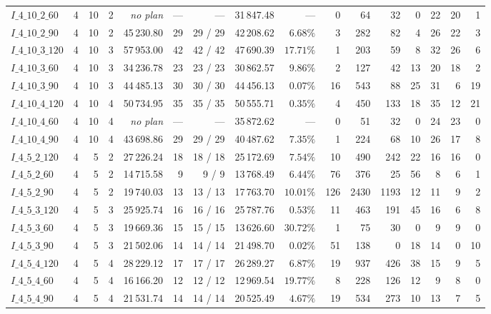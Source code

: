 \begin{table}[!htbp]
{\begin{tabular}{lrrrrrrlrrrrrrrr}
$I\_4\_10\_2\_60$ & 4 & 10 & 2 & \emph{no plan} & --- & --- & 31\,847.48 & --- & 0 & 64 & 32 & 0 & 22 & 20 & 1 \\
$I\_4\_10\_2\_90$ & 4 & 10 & 2 & 45\,230.80 & 29 & 29 / 29 & 42\,208.62 & $6.68\%$ & 3 & 282 & 82 & 4 & 26 & 22 & 3 \\
$I\_4\_10\_3\_120$ & 4 & 10 & 3 & 57\,953.00 & 42 & 42 / 42 & 47\,690.39 & $17.71\%$ & 1 & 203 & 59 & 8 & 32 & 26 & 6 \\
$I\_4\_10\_3\_60$ & 4 & 10 & 3 & 34\,236.78 & 23 & 23 / 23 & 30\,862.57 & $9.86\%$ & 2 & 127 & 42 & 13 & 20 & 18 & 2 \\
$I\_4\_10\_3\_90$ & 4 & 10 & 3 & 44\,485.13 & 30 & 30 / 30 & 44\,456.13 & $0.07\%$ & 16 & 543 & 88 & 25 & 31 & 6 & 19 \\
$I\_4\_10\_4\_120$ & 4 & 10 & 4 & 50\,734.95 & 35 & 35 / 35 & 50\,555.71 & $0.35\%$ & 4 & 450 & 133 & 18 & 35 & 12 & 21 \\
$I\_4\_10\_4\_60$ & 4 & 10 & 4 & \emph{no plan} & --- & --- & 35\,872.62 & --- & 0 & 51 & 32 & 0 & 24 & 23 & 0 \\
$I\_4\_10\_4\_90$ & 4 & 10 & 4 & 43\,698.86 & 29 & 29 / 29 & 40\,487.62 & $7.35\%$ & 1 & 224 & 68 & 10 & 26 & 17 & 8 \\
$I\_4\_5\_2\_120$ & 4 & 5 & 2 & 27\,226.24 & 18 & 18 / 18 & 25\,172.69 & $7.54\%$ & 10 & 490 & 242 & 22 & 16 & 16 & 0 \\
$I\_4\_5\_2\_60$ & 4 & 5 & 2 & 14\,715.58 & 9 & 9 / 9 & 13\,768.49 & $6.44\%$ & 76 & 376 & 25 & 56 & 8 & 6 & 1 \\
$I\_4\_5\_2\_90$ & 4 & 5 & 2 & 19\,740.03 & 13 & 13 / 13 & 17\,763.70 & $10.01\%$ & 126 & 2430 & 1193 & 12 & 11 & 9 & 2 \\
$I\_4\_5\_3\_120$ & 4 & 5 & 3 & 25\,925.74 & 16 & 16 / 16 & 25\,787.76 & $0.53\%$ & 11 & 463 & 191 & 45 & 16 & 6 & 8 \\
$I\_4\_5\_3\_60$ & 4 & 5 & 3 & 19\,669.36 & 15 & 15 / 15 & 13\,626.60 & $30.72\%$ & 1 & 75 & 30 & 0 & 9 & 9 & 0 \\
$I\_4\_5\_3\_90$ & 4 & 5 & 3 & 21\,502.06 & 14 & 14 / 14 & 21\,498.70 & $0.02\%$ & 51 & 138 & 0 & 18 & 14 & 0 & 10 \\
$I\_4\_5\_4\_120$ & 4 & 5 & 4 & 28\,229.12 & 17 & 17 / 17 & 26\,289.27 & $6.87\%$ & 19 & 937 & 426 & 38 & 15 & 9 & 5 \\
$I\_4\_5\_4\_60$ & 4 & 5 & 4 & 16\,166.20 & 12 & 12 / 12 & 12\,969.54 & $19.77\%$ & 8 & 228 & 126 & 12 & 9 & 8 & 0 \\
$I\_4\_5\_4\_90$ & 4 & 5 & 4 & 21\,531.74 & 14 & 14 / 14 & 20\,525.49 & $4.67\%$ & 19 & 534 & 273 & 10 & 13 & 7 & 5 \\

\end{tabular}}
\end{table}
